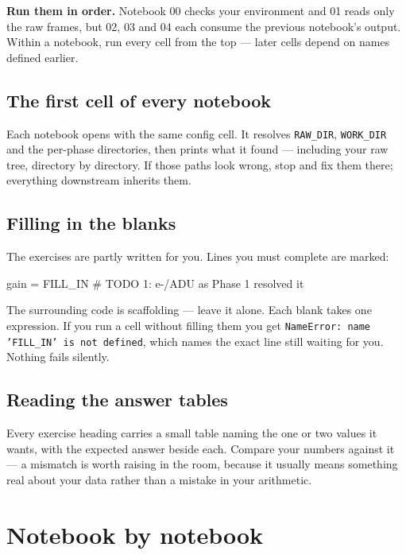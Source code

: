 \documentclass[11pt,a4paper]{article}
\newcommand{\cm}[1]{\texttt{\small #1}}
\newcommand{\cmt}[1]{\textcolor{inkfaint}{#1}}
\begin{document}
\textbf{Run them in order.} Notebook 00 checks your environment and 01 reads only the raw
frames, but 02, 03 and 04 each consume the previous notebook's output. Within a notebook, run
every cell from the top --- later cells depend on names defined earlier.

\subsection{The first cell of every notebook}
Each notebook opens with the same config cell. It resolves \cm{RAW\_DIR}, \cm{WORK\_DIR} and
the per-phase directories, then prints what it found --- including your raw tree, directory by
directory. If those paths look wrong, stop and fix them there; everything downstream inherits
them.

\subsection{Filling in the blanks}
The exercises are partly written for you. Lines you must complete are marked:

\begin{cmd}
\begin{cmdtext}
gain = FILL_IN        \cmt{# TODO 1: e-/ADU as Phase 1 resolved it}
\end{cmdtext}
\end{cmd}

The surrounding code is scaffolding --- leave it alone. Each blank takes one expression. If you
run a cell without filling them you get \cm{NameError: name 'FILL\_IN' is not defined}, which
names the exact line still waiting for you. Nothing fails silently.

\subsection{Reading the answer tables}
Every exercise heading carries a small table naming the one or two values it wants, with the
expected answer beside each. Compare your numbers against it --- a mismatch is worth raising in
the room, because it usually means something real about your data rather than a mistake in your
arithmetic.

\section{Notebook by notebook}
\end{document}
